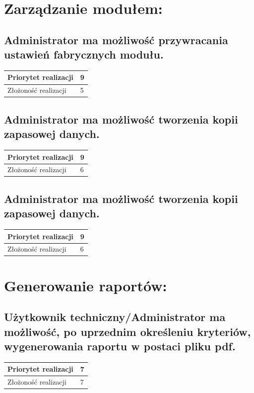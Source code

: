 \documentclass[11pt, a4paper, oneside]{report}
\begin{document}
\section{Zarządzanie modułem:}
\subsection{Administrator ma możliwość przywracania ustawień fabrycznych modułu.}
\begin{center}
\begin{tabular}[c]{| l | l | }
  \hline			
  Priorytet realizacji & 9 \\
  \hline
  Złożoność realizacji & 5 \\
  \hline  
\end{tabular}
\end{center}

\subsection{Administrator ma możliwość tworzenia kopii zapasowej danych.}
\begin{center}
\begin{tabular}[c]{| l | l | }
  \hline			
  Priorytet realizacji & 9 \\
  \hline
  Złożoność realizacji & 6 \\
  \hline  
\end{tabular}
\end{center}

\subsection{Administrator ma możliwość tworzenia kopii zapasowej danych.}
\begin{center}
\begin{tabular}[c]{| l | l | }
  \hline			
  Priorytet realizacji & 9 \\
  \hline
  Złożoność realizacji & 6 \\
  \hline  
\end{tabular}
\end{center}

\section{Generowanie raportów:}
\subsection{Użytkownik techniczny/Administrator ma możliwość, po uprzednim określeniu kryteriów, wygenerowania raportu w postaci pliku pdf.}
\begin{center}
\begin{tabular}[c]{| l | l | }
  \hline			
  Priorytet realizacji & 7 \\
  \hline
  Złożoność realizacji & 7 \\
  \hline  
\end{tabular}
\end{center}
\end{document}
